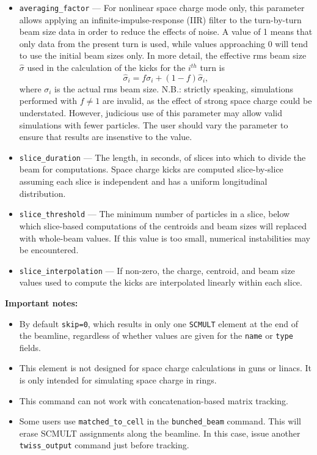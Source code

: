 \documentclass[11pt]{article}
\begin{document}
\begin{itemize}
\item \verb|averaging_factor| --- For nonlinear space charge mode only, this parameter allows applying an infinite-impulse-response 
  (IIR) filter to the turn-by-turn beam size data in order to reduce the effects of noise. 
  A value of 1 means that only data from the present turn
  is used, while values approaching 0 will tend to use the initial beam sizes only.
  In more detail, the effective rms beam size $\hat{\sigma}$ used in the calculation of the kicks for the $i^{th}$ turn is 
  \begin{equation}
    \hat{\sigma}_i = f\sigma_i + (1-f) \hat{\sigma}_i,
  \end{equation}
  where $\sigma_i$ is the actual rms beam size.
  N.B.: strictly speaking, simulations performed with $f\ne 1$ are invalid, as the effect of strong space charge could
  be understated. However, judicious use of this parameter may allow valid simulations with fewer particles.
  The user should vary the parameter to ensure that results are insenstive to the value.
\item \verb|slice_duration| --- The length, in seconds, of slices into which to divide the beam for computations.
  Space charge kicks are computed slice-by-slice assuming each slice is independent and has a uniform longitudinal
  distribution.
\item \verb|slice_threshold| --- The minimum number of particles in a slice, below which slice-based computations
  of the centroids and beam sizes will replaced with whole-beam values. If this value is too small, numerical
  instabilities may be encountered.
\item \verb|slice_interpolation| --- If non-zero, the charge, centroid, and beam size values used to compute the
  kicks are interpolated linearly within each slice.
\end{itemize}

{\bf Important notes:}
\begin{itemize}
\item By default \verb|skip=0|, which results in only one \verb|SCMULT| element at the end of the beamline,
  regardless of whether values are given for the \verb|name| or \verb|type| fields.
\item This element is not designed for space charge calculations in guns or linacs.  It is only intended for
  simulating space charge in rings. 
\item This command can not work with concatenation-based matrix tracking.  
\item Some users use \verb|matched_to_cell| in the \verb|bunched_beam| command. 
  This will erase SCMULT assignments along the beamline. In this case, issue another \verb|twiss_output|
  command just before tracking.
\end{itemize}
\end{document}
